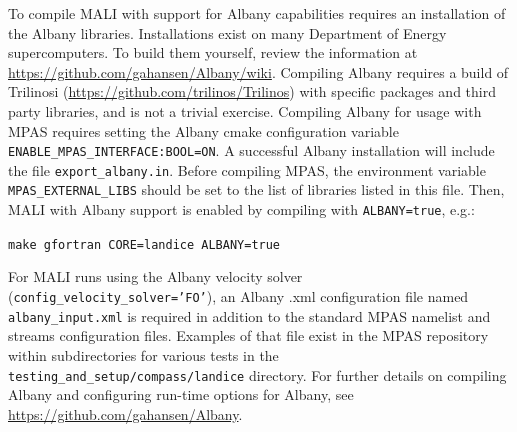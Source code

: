 To compile MALI with support for Albany capabilities requires an installation of the Albany libraries.
Installations exist on many Department of Energy supercomputers.
To build them yourself, review the information at \url{https://github.com/gahansen/Albany/wiki}.
Compiling Albany requires a build of Trilinosi (\url{https://github.com/trilinos/Trilinos}) with specific packages and third party libraries,
and is not a trivial exercise.
Compiling Albany for usage with MPAS requires setting the Albany cmake configuration variable {\tt ENABLE\_MPAS\_INTERFACE:BOOL=ON}.
A successful Albany installation will include the file {\tt export\_albany.in}.  
Before compiling MPAS, the environment variable {\tt MPAS\_EXTERNAL\_LIBS} should be set to the list of libraries listed in this file.
Then, MALI with Albany support is enabled by compiling with {\tt ALBANY=true}, e.g.:

{\tt make gfortran CORE=landice ALBANY=true}

For MALI runs using the Albany velocity solver ({\tt config\_velocity\_solver='FO'}), an Albany .xml configuration file named {\tt albany\_input.xml}
is required in addition to the standard MPAS namelist and streams configuration files.
Examples of that file exist in the MPAS repository within subdirectories for various tests in the {\tt testing\_and\_setup/compass/landice} directory.
For further details on compiling Albany and configuring run-time options for Albany, see  \url{https://github.com/gahansen/Albany}.

